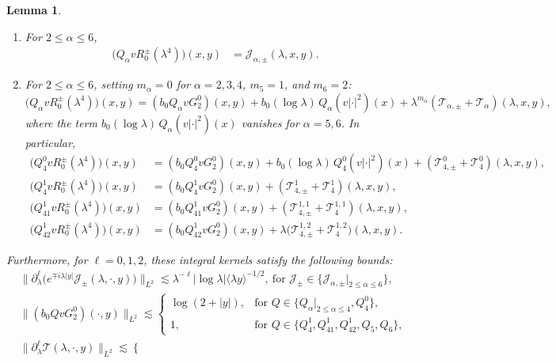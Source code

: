 \documentclass[10pt,a4paper]{amsart}
\newtheorem{lemma}{Lemma}
\begin{document}
\begin{lemma}
\begin{enumerate}
		\item[(ii)] For $2\le\alpha\le6$, 
		\begin{align*}
		\bigl(Q_\alpha v R_0^\pm(\lambda^4)\bigr)(x,y)&=\mathcal{J}_{\alpha, \pm} (\lambda,x,y).
		\end{align*}
		\item[(iii)] For $2\le\alpha\le6$,
		setting $m_\alpha=0$ for $\alpha=2,3,4$, $m_5=1$, and $m_6=2$:
		$$
			\bigl(Q_\alpha v R_0^\pm(\lambda^4)\bigr)(x,y) =(b_0Q_\alpha v G_2^0)(x,y)+b_0(\log\lambda)\,Q_\alpha(v|\cdot|^2)(x)+ \lambda^{m_\alpha} (\mathcal{T}_{\alpha, \pm} + \mathcal{T}_\alpha)(\lambda, x, y),
        $$
		where the term $b_0 (\log\lambda) \, Q_\alpha(v|\cdot|^2)(x)$ vanishes
        for $\alpha=5,6$.
		In particular,
		\begin{align*}
\bigl(Q_4^0 v R_0^\pm(\lambda^4)\bigr)(x,y) &=(b_0Q_4^0 v G_2^0)(x,y)+b_0(\log\lambda)\,Q_4^0(v|\cdot|^2)(x)+(\mathcal{T}_{4,\pm}^0+\mathcal{T}_4^0)(\lambda,x,y),\\
\bigl(Q_4^1 v R_0^\pm(\lambda^4)\bigr)(x,y) &=(b_0Q_4^1 v G_2^0)(x,y)+(\mathcal{T}_{4,\pm}^1+\mathcal{T}_4^1)(\lambda,x,y),\\
\bigl(Q_{41}^1  v R_0^\pm(\lambda^4)\bigr)(x,y) &=(b_0Q_{41}^1  v G_2^0)(x,y)+(\mathcal{T}_{4,\pm}^{1,1}+\mathcal{T}_4^{1,1})(\lambda,x,y),\\
\bigl(Q_{42}^1  v R_0^\pm(\lambda^4)\bigr)(x,y) &=(b_0Q_{42}^1  v G_2^0)(x,y)+\lambda\bigl(\mathcal{T}_{4,\pm}^{1,2}+\mathcal{T}_4^{1,2})(\lambda,x,y).
		\end{align*}
	\end{enumerate}
	Furthermore, for $\ell=0,1,2$, these integral kernels satisfy the following bounds:
	\begin{align}\label{J}
		&\|\partial_\lambda^\ell\big(e^{\mp i\lambda|y|}\mathcal{J}_{\pm}(\lambda,\cdot,y)\big)\|_{L^2} \lesssim\lambda^{-\ell}|\log\lambda|\langle\lambda y\rangle^{-1/2},\  \text{for } \mathcal{J}_{\pm} \in \{\mathcal{J}_{\alpha,\pm}|_{2\le\alpha\le6}\},\\
&\bigl\|(b_0Q v G_2^0)(\cdot,y)\bigr\|_{L^2} \lesssim
		\begin{cases}
		\log(2+|y|), & \text{for } Q \in \{Q_\alpha|_{2 \le \alpha \le 4}, Q_4^0\}, \\[2pt]
		1, & \text{for } Q \in \{Q_4^1, Q_{41}^1, Q_{42}^1, Q_5, Q_6\},
		\end{cases} \label{lemma_projection_G} \\
&\|\partial_\lambda^\ell\mathcal{T}(\lambda,\cdot,y)\|_{L^2} \lesssim
		\begin{cases}

\end{cases}
\end{align}
\end{lemma}
\end{document}
